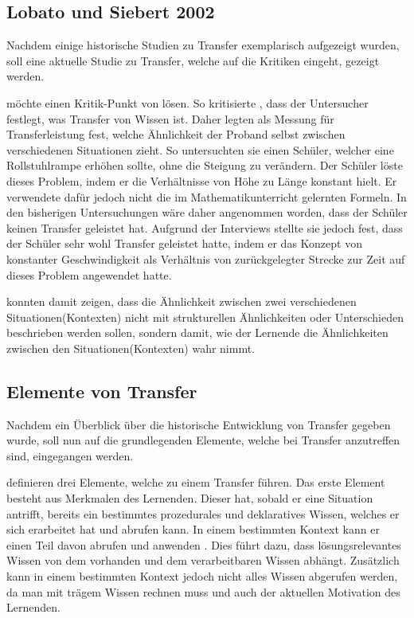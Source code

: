 \subsection{Lobato und Siebert 2002}



Nachdem einige historische Studien zu Transfer exemplarisch aufgezeigt wurden, soll eine aktuelle Studie zu Transfer, welche auf die Kritiken eingeht, gezeigt werden.


\citet{Lobato2002a} möchte einen Kritik-Punkt von \citet{Lave1988} lösen. So kritisierte \citeauthor{Lave1988}, dass der Untersucher festlegt, was Transfer von Wissen ist. Daher legten \citet{Lobato2002a} als Messung für Transferleistung fest, welche Ähnlichkeit der Proband selbst zwischen verschiedenen Situationen zieht. So untersuchten sie einen Schüler, welcher eine Rollstuhlrampe erhöhen sollte, ohne die Steigung zu verändern. Der Schüler löste dieses Problem, indem er die Verhältnisse von Höhe zu Länge konstant hielt. Er verwendete dafür jedoch nicht die im Mathematikunterricht gelernten Formeln. In den bisherigen Untersuchungen wäre daher angenommen worden, dass der Schüler keinen Transfer geleistet hat. Aufgrund der Interviews stellte sie jedoch fest, dass der Schüler sehr wohl Transfer geleistet hatte, indem er das Konzept von konstanter Geschwindigkeit als Verhältnis von zurückgelegter Strecke zur Zeit auf dieses Problem angewendet hatte.

\citet{Lobato2002a} konnten damit zeigen, dass die Ähnlichkeit zwischen zwei verschiedenen Situationen(Kontexten) nicht mit strukturellen Ähnlichkeiten oder Unterschieden beschrieben werden sollen,  sondern damit, wie der Lernende die Ähnlichkeiten zwischen den Situationen(Kontexten) wahr nimmt.

\subsection{Elemente von Transfer}

Nachdem ein Überblick über die historische Entwicklung von Transfer gegeben wurde, soll nun auf die grundlegenden Elemente, welche bei Transfer anzutreffen sind, eingegangen werden.

\citet{Marini1995} definieren drei Elemente, welche zu einem Transfer führen. Das erste Element besteht aus Merkmalen des Lernenden. Dieser hat, sobald er eine Situation antrifft, bereits ein bestimmtes prozedurales und deklaratives Wissen, welches er sich erarbeitet hat und abrufen kann. In einem bestimmten Kontext kann er einen Teil davon abrufen und anwenden \citep[siehe Seite 189ff]{Marini1995}. Dies führt dazu, dass lösungsrelevantes Wissen von dem vorhanden und dem verarbeitbaren Wissen abhängt. Zusätzlich kann in einem bestimmten Kontext jedoch nicht alles Wissen abgerufen werden, da man mit trägem Wissen rechnen muss und auch der aktuellen Motivation des Lernenden. 

